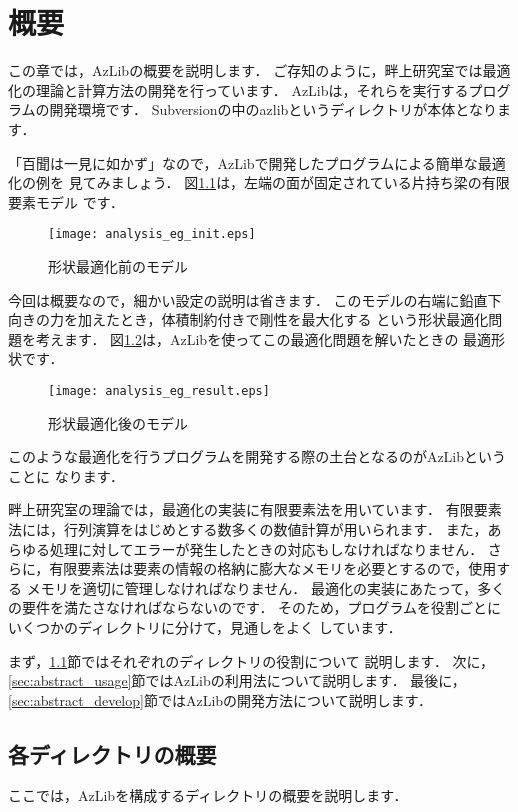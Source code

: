 \chapter{概要} \label{chap:abstract}
この章では，AzLibの概要を説明します．
ご存知のように，畔上研究室では最適化の理論と計算方法の開発を行っています．
AzLibは，それらを実行するプログラムの開発環境です．
Subversionの中のazlibというディレクトリが本体となります．

「百聞は一見に如かず」なので，AzLibで開発したプログラムによる簡単な最適化の例を
見てみましょう．
図\ref{fg:analysis_eg_init}は，左端の面が固定されている片持ち梁の有限要素モデル
です．
\begin{figure}
	\centering \texttt{[image: analysis\_eg\_init.eps]}
	\caption{形状最適化前のモデル} \label{fg:analysis_eg_init}
\end{figure}
今回は概要なので，細かい設定の説明は省きます．
このモデルの右端に鉛直下向きの力を加えたとき，体積制約付きで剛性を最大化する
という形状最適化問題を考えます．
図\ref{fg:analysis_eg_result}は，AzLibを使ってこの最適化問題を解いたときの
最適形状です．
\begin{figure}
	\centering \texttt{[image: analysis\_eg\_result.eps]}
	\caption{形状最適化後のモデル} \label{fg:analysis_eg_result}
\end{figure}
このような最適化を行うプログラムを開発する際の土台となるのがAzLibということに
なります．

畔上研究室の理論では，最適化の実装に有限要素法を用いています．
有限要素法には，行列演算をはじめとする数多くの数値計算が用いられます．
また，あらゆる処理に対してエラーが発生したときの対応もしなければなりません．
さらに，有限要素法は要素の情報の格納に膨大なメモリを必要とするので，使用する
メモリを適切に管理しなければなりません．
最適化の実装にあたって，多くの要件を満たさなければならないのです．
そのため，プログラムを役割ごとにいくつかのディレクトリに分けて，見通しをよく
しています．

まず，\ref{sec:abstract_directory}節ではそれぞれのディレクトリの役割について
説明します． 
次に，\ref{sec:abstract_usage}節ではAzLibの利用法について説明します． 
最後に，\ref{sec:abstract_develop}節ではAzLibの開発方法について説明します．

\section{各ディレクトリの概要} \label{sec:abstract_directory}
ここでは，AzLibを構成するディレクトリの概要を説明します．


